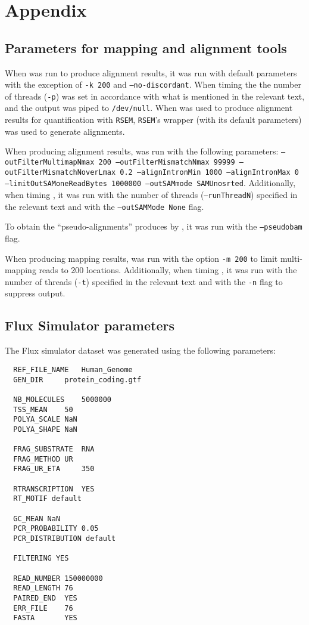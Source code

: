 
\chapter{Appendix} %
\label{appendix}

\section{Parameters for mapping and alignment tools}
\label{subsec:params}

When \bt was run to produce alignment results, it was run with default parameters with the exception of \texttt{-k 200} and \texttt{--no-discordant}.  When timing \bt the the number of threads (\texttt{-p}) was set in accordance with what is mentioned in the relevant text, and the output was piped to \texttt{/dev/null}.  When \bt was used to produce alignment results for quantification with \texttt{RSEM}, \texttt{RSEM}'s \bt wrapper (with its default parameters) was used to generate alignments.

When producing alignment results, \STAR was run with the following parameters: \texttt{--outFilterMultimapNmax 200 --outFilterMismatchNmax 99999 --outFilterMismatchNoverLmax 0.2 --alignIntronMin 1000 --alignIntronMax 0 --limitOutSAMoneReadBytes 1000000 --outSAMmode SAMUnosrted}.  Additionally, when timing \STAR, it was run with the number of threads (\texttt{--runThreadN}) specified in the relevant text and with the \texttt{--outSAMMode None} flag.


To obtain the ``pseudo-alignments'' produces by \kallisto, it was run with the \texttt{--pseudobam} flag.

When producing mapping results, \rapmap was run with the option \texttt{-m 200} to limit multi-mapping reads to 200 locations.  Additionally, when timing \rapmap, it was run with the number of threads (\texttt{-t}) specified in the relevant text and with the \texttt{-n} flag to suppress output.

\section{Flux Simulator parameters}
\label{subsec:flux_params}


The Flux simulator dataset was generated using the following parameters:

\begin{verbatim}
  REF_FILE_NAME   Human_Genome
  GEN_DIR     protein_coding.gtf

  NB_MOLECULES    5000000
  TSS_MEAN    50
  POLYA_SCALE NaN
  POLYA_SHAPE NaN

  FRAG_SUBSTRATE  RNA
  FRAG_METHOD UR
  FRAG_UR_ETA     350

  RTRANSCRIPTION  YES
  RT_MOTIF default

  GC_MEAN NaN
  PCR_PROBABILITY 0.05
  PCR_DISTRIBUTION default

  FILTERING YES

  READ_NUMBER 150000000
  READ_LENGTH 76
  PAIRED_END  YES
  ERR_FILE    76
  FASTA       YES
\end{verbatim}


